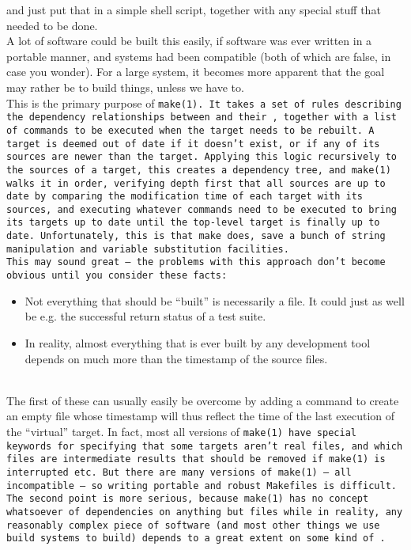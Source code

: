 and just put that in a simple shell script, together with any special stuff
that needed to be done.
\\
A lot of software could be built this easily, if software was ever written
in a portable manner, and systems had been compatible (both of which are false, in case
you wonder). For a large system, it becomes more apparent that the goal may rather be
 to build things, unless we have to.
\\
This is the primary purpose of \tt{make(1)}. It takes a set
of rules describing the dependency relationships between  and
their , together with a list of commands to be executed when
the target needs to be rebuilt. A target is deemed out of date if it doesn't
exist, or if any of its sources are newer than the target.
Applying this logic recursively to the sources of a target, this creates a
dependency tree, and \tt{make(1)} walks it in order, verifying depth first that
all sources are up to date by comparing the modification time of each target with its
sources, and executing whatever commands need to be executed to bring its targets
up to date until the top-level target is finally up to date. Unfortunately, this is
 that make does, save a bunch of string manipulation and variable
substitution facilities.
\\
This may sound great -- the problems with this approach don't become obvious
until you consider these facts:
\\
\begin{itemize}
  \item Not everything that should be ``built'' is necessarily a file. It could
    just as well be e.g. the successful return status of a test suite.
  \item In reality, almost everything that is ever built by any development tool
    depends on much more than the timestamp of the source files.
\end{itemize}
\\
The first of these can usually easily be overcome by adding a
command to create an empty file whose timestamp will thus reflect the time
of the last execution of the ``virtual'' target. In fact, most all versions
of \tt{make(1)} have special keywords for specifying that some targets aren't
real files, and which files are intermediate results that should be removed
if \tt{make(1)} is interrupted etc. But there are many versions of \tt{make(1)}
-- all incompatible -- so writing portable and robust Makefiles is difficult.
\\
The second point is more serious, because \tt{make(1)} has no concept whatsoever
of dependencies on anything but files while in reality, any reasonably complex
piece of software (and most other things we use build systems to build) depends
to a great extent on some kind of .

